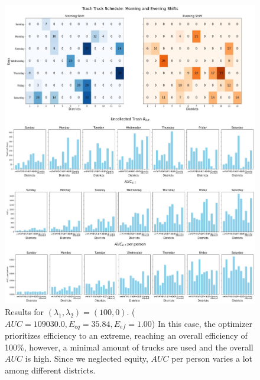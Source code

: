\documentclass{article}
\begin{document}
\begin{figure}[H]
	\centering
	\includegraphics[width=1\textwidth]{figures/(100,0).jpg}
	\caption{Results for $(\lambda_1, \lambda_2) = (100,0)$. ($AUC = 109030.0, E_{eq} = 35.84, E_{ef} = 1.00$) In this case, the optimizer prioritizes efficiency to an extreme, reaching an overall efficiency of 100\%, however, a minimal amount of trucks are used and the overall $AUC$ is high. Since we neglected equity, $AUC$ per person varies a lot among different districts.}
	\label{fig:2all}
\end{figure}
\end{document}
